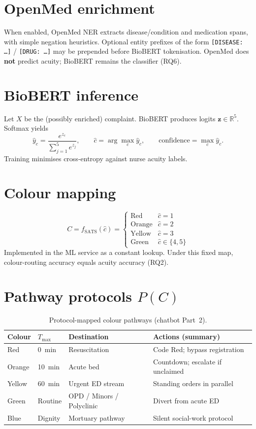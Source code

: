 \section{OpenMed enrichment}

When enabled, OpenMed NER extracts disease/condition and medication spans, with simple negation heuristics. Optional entity prefixes of the form \texttt{[DISEASE: \ldots]} / \texttt{[DRUG: \ldots]} may be prepended before BioBERT tokenisation. OpenMed does \textbf{not} predict acuity; BioBERT remains the classifier (RQ6).

\section{BioBERT inference}

Let \(X\) be the (possibly enriched) complaint. BioBERT produces logits \(\mathbf{z}\in\mathbb{R}^{5}\). Softmax yields
\[
\hat{y}_c=\frac{e^{z_c}}{\sum_{j=1}^{5}e^{z_j}},\qquad
\hat{c}=\arg\max_c\hat{y}_c,\qquad
\mathrm{confidence}=\max_c\hat{y}_c.
\]
Training minimises cross-entropy against nurse acuity labels.

\section{Colour mapping}

\[
C=f_{\mathrm{SATS}}(\hat{c})=
\begin{cases}
\mathrm{Red} & \hat{c}=1\\
\mathrm{Orange} & \hat{c}=2\\
\mathrm{Yellow} & \hat{c}=3\\
\mathrm{Green} & \hat{c}\in\{4,5\}
\end{cases}
\]
Implemented in the ML service as a constant lookup. Under this fixed map, colour-routing accuracy equals acuity accuracy (RQ2).

\section{Pathway protocols \(P(C)\)}

\begin{table}[h]
\centering
\caption{Protocol-mapped colour pathways (chatbot Part~2).}
\label{tab:pathways}
\begin{tabular}{p{1.6cm}p{1.8cm}p{3.2cm}p{5cm}}
\hline
Colour & \(T_{\max}\) & Destination & Actions (summary) \\
\hline
Red & 0~min & Resuscitation & Code Red; bypass registration \\
Orange & 10~min & Acute bed & Countdown; escalate if unclaimed \\
Yellow & 60~min & Urgent ED stream & Standing orders in parallel \\
Green & Routine & OPD / Minors / Polyclinic & Divert from acute ED \\
Blue & Dignity & Mortuary pathway & Silent social-work protocol \\
\hline
\end{tabular}
\end{table}

